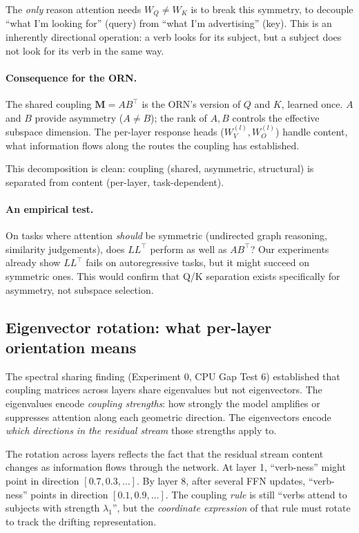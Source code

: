 \documentclass[11pt, a4paper]{article}
\newcommand{\M}{\mathbf{M}}
\theoremstyle{remark}
\begin{document}
The \emph{only} reason attention needs $W_Q \neq W_K$ is to break this symmetry, to decouple ``what I'm looking for'' (query) from ``what I'm advertising'' (key).
This is an inherently directional operation: a verb looks for its subject, but a subject does not look for its verb in the same way.

\paragraph{Consequence for the ORN.}
The shared coupling $\M = AB^\top$ is the ORN's version of $Q$ and $K$, learned once.
$A$ and $B$ provide asymmetry ($A \neq B$); the rank of $A, B$ controls the effective subspace dimension.
The per-layer response heads ($W_V^{(l)}, W_O^{(l)}$) handle content, what information flows along the routes the coupling has established.

This decomposition is clean: coupling (shared, asymmetric, structural) is separated from content (per-layer, task-dependent).

\paragraph{An empirical test.}
On tasks where attention \emph{should} be symmetric (undirected graph reasoning, similarity judgements), does $LL^\top$ perform as well as $AB^\top$?
Our experiments already show $LL^\top$ fails on autoregressive tasks, but it might succeed on symmetric ones.
This would confirm that Q/K separation exists specifically for asymmetry, not subspace selection.

\subsection*{Eigenvector rotation: what per-layer orientation means}

The spectral sharing finding (Experiment 0, CPU Gap Test 6) established that coupling matrices across layers share eigenvalues but not eigenvectors.
The eigenvalues encode \emph{coupling strengths}: how strongly the model amplifies or suppresses attention along each geometric direction.
The eigenvectors encode \emph{which directions in the residual stream} those strengths apply to.

The rotation across layers reflects the fact that the residual stream content changes as information flows through the network.
At layer 1, ``verb-ness'' might point in direction $[0.7, 0.3, \ldots]$.
By layer 8, after several FFN updates, ``verb-ness'' points in direction $[0.1, 0.9, \ldots]$.
The coupling \emph{rule} is still ``verbs attend to subjects with strength $\lambda_1$'', but the \emph{coordinate expression} of that rule must rotate to track the drifting representation.
\end{document}
